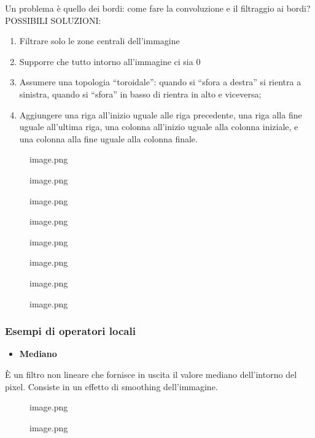 \documentclass[
]{article}
\providecommand{\tightlist}{%
  \setlength{\itemsep}{0pt}\setlength{\parskip}{0pt}}
\begin{document}
Un problema è quello dei bordi: come fare la convoluzione e il filtraggio ai bordi?
POSSIBILI SOLUZIONI:

\begin{enumerate}
\def\labelenumi{\arabic{enumi}.}
\tightlist
\item
  Filtrare solo le zone centrali dell'immagine
\item
  Supporre che tutto intorno all'immagine ci sia 0
\item
  Assumere una topologia ``toroidale'': quando si ``sfora a destra'' si rientra a sinistra, quando si ``sfora'' in basso di rientra in alto e viceversa;
\item
  Aggiungere una riga all'inizio uguale alle riga precedente, una riga alla fine uguale all'ultima riga, una colonna all'inizio uguale alla colonna iniziale, e una colonna alla fine uguale alla colonna finale.
\end{enumerate}

\begin{figure}
\centering
{image.png}
\caption{image.png}
\end{figure}

\begin{figure}
\centering
{image.png}
\caption{image.png}
\end{figure}

\begin{figure}
\centering
{image.png}
\caption{image.png}
\end{figure}

\begin{figure}
\centering
{image.png}
\caption{image.png}
\end{figure}

\hypertarget{esempi-di-operatori-locali}{%
\subsubsection{Esempi di operatori locali}\label{esempi-di-operatori-locali}}

\begin{itemize}
\tightlist
\item
  \textbf{Mediano}
\end{itemize}

È un filtro non lineare che fornisce in uscita il valore mediano dell'intorno del pixel. Consiste in un effetto di smoothing dell'immagine.

\begin{figure}
\centering
{image.png}
\caption{image.png}
\end{figure}
\end{document}
